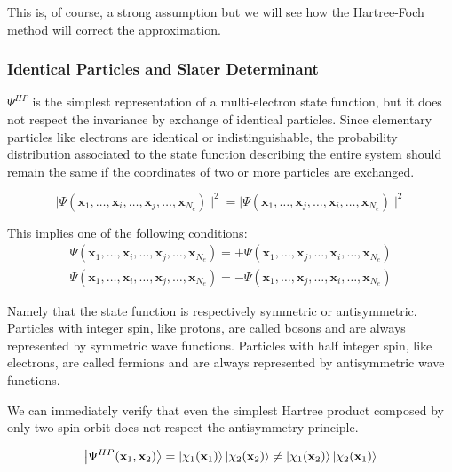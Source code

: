 \documentclass[a4paper,12pt]{article}
\begin{document}
This is, of course, a strong assumption but we will see how the Hartree-Foch method will correct the approximation.



\subsubsection{Identical Particles and Slater Determinant}

$\Psi^{HP}$ is the simplest representation of a multi-electron state function, but it does not respect the invariance by exchange of identical particles.
Since elementary particles like electrons are identical or indistinguishable, the probability distribution associated to the state function describing the entire system should remain the same if the coordinates of two or more particles are exchanged.

\begin{equation}
	\mid \Psi(\mathbf{x}_1,\dots,\mathbf{x}_i,\dots,\mathbf{x}_j,\dots,\mathbf{x}_{N_e}) \mid^2 = \mid \Psi(\mathbf{x}_1,\dots,\mathbf{x}_j,\dots,\mathbf{x}_i,\dots,\mathbf{x}_{N_e}) \mid^2
\end{equation}

This implies one of the following conditions:
\begin{align}
	\Psi(\mathbf{x}_1,\dots,\mathbf{x}_i,\dots,\mathbf{x}_j,\dots,\mathbf{x}_{N_e}) = 
		+\Psi(\mathbf{x}_1,\dots,\mathbf{x}_j,\dots,\mathbf{x}_i,\dots,\mathbf{x}_{N_e})\\
	\Psi(\mathbf{x}_1,\dots,\mathbf{x}_i,\dots,\mathbf{x}_j,\dots,\mathbf{x}_{N_e}) = 
		-\Psi(\mathbf{x}_1,\dots,\mathbf{x}_j,\dots,\mathbf{x}_i,\dots,\mathbf{x}_{N_e}) 
\end{align}

Namely that the state function is respectively symmetric or antisymmetric.
Particles with integer spin, like protons, are called bosons and are always represented by symmetric wave functions.
Particles with half integer spin, like electrons, are called fermions and are always represented by antisymmetric wave functions.

We can immediately verify that even the simplest Hartree product composed by only two spin orbit does not respect the antisymmetry principle.

\begin{equation*}
	\ket{\Psi^{HP}(\mathbf{x}_1,\mathbf{x}_2)} = \ket{\chi_1(\mathbf{x}_1)} \ket{\chi_2(\mathbf{x}_2)} \neq \ket{\chi_1(\mathbf{x}_2)} \ket{\chi_2(\mathbf{x}_1)}
\end{equation*}
\end{document}
